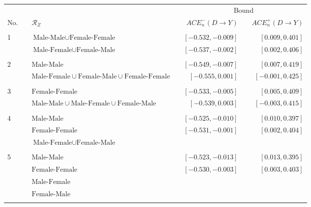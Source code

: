 \documentclass[10pt,a4paper,twoside]{article}
\numberwithin{equation}{section}
\begin{document}
\begin{sidewaystable}[p]
\centering
\caption{$\mathcal{R}_Z$ and admissible sets of values of $ACE_n(D\rightarrow Y)$.}
\centering
\begin{subfigure}{\textwidth}
\centering
\begin{tabular}{lclcrcr}
\toprule
&	&  & &\multicolumn{3}{c}{Bound} \\
\cmidrule(r){4-7}	
No.& &	$\mathcal{R}_Z$	&	&	$ACE_n^-(D\rightarrow Y)$	&	&	$ACE_n^+(D\rightarrow Y)$\\
\midrule
& &\phantom{$\text{Male-Female}\cup\text{Female-Male}\cup\text{Female-Female}$}\\
1& &$\text{Male-Male}\cup\text{Female-Female}$	&	&	$[-0.532,-0.009]$	&	&	$[0.009,0.401]$	\\
& &$\text{Male-Female}\cup\text{Female-Male}$	&	&	\color{blue}$[-0.537,-0.002]$	&	&	\color{blue}$[0.002,0.406]$	\\
\\
2& &$\text{Male-Male}$	&	&	$[-0.549,-0.007]$	&	&	$[0.007,0.419]$	\\
& &$\text{Male-Female}\cup\text{Female-Male}\cup\text{Female-Female}$	&	&	\color{blue}$[-0.555,0.001]$	&	&	\color{blue}$[-0.001,0.425]$\\
\\
3& &$\text{Female-Female}$	&	&	$[-0.533,-0.005]$	&	&	$[0.005,0.409]$	\\
& &$\text{Male-Male}\cup\text{Male-Female}\cup\text{Female-Male}$	& &\color{blue}$[-0.539,0.003]$	&	&	\color{blue}$[-0.003,0.415]$\\	
\\
4& &$\text{Male-Male}$&	&	$[-0.525,-0.010]$	&	&	$[0.010,0.397]$	\\
& &$\text{Female-Female}$ & &\color{blue}$[-0.531,-0.001]$	&	&	\color{blue}$[0.002,0.404]$\\
& &$\text{Male-Female}\cup\text{Female-Male}$\\	
\\
5& &$\text{Male-Male}$&	&	$[-0.523,-0.013]$	&	&	$[0.013,0.395]$	\\
& &$\text{Female-Female}$& &\color{blue}$[-0.530,-0.003]$	&	&	\color{blue}$[0.003,0.403]$	\\
& &$\text{Male-Female}$ \\
& &$\text{Female-Male}$\\	
	\\
\bottomrule
\end{tabular}
\vspace{10pt}

\end{subfigure}
\end{sidewaystable}
\end{document}
